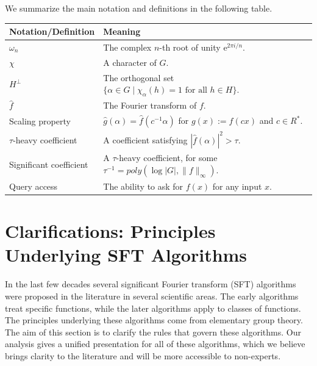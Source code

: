 \documentclass[11pt]{article}
\theoremstyle{definition}
\begin{document}
We summarize the main notation and definitions in the following table.
\begin{center}
    \begin{tabular}{ l l }
        \hline
        Notation/Definition      & Meaning                                                                                \\ \hline
        $\omega_n$               & The complex $n$-th root of unity $\mathrm{e}^{2\pi i/n}$.                              \\
        $\chi$                   & A character of $G$.                                                                    \\
        $H^\perp$                & The orthogonal set $\{\alpha \in G \mid \chi_\alpha(h) = 1 \text{ for all }h\in H\}$.  \\
        $\widehat{f}$            & The Fourier transform of $f$.                                                          \\
        Scaling property         & $\widehat{g}(\alpha) = \widehat{f}(c^{-1}\alpha)$ for $g(x) := f(cx)$ and $c \in R^*$. \\
        $\tau$-heavy coefficient & A coefficient satisfying $|\widehat{f}(\alpha)|^2>\tau$.                               \\
        Significant coefficient  & A $\tau$-heavy coefficient, for some $\tau^{-1} = poly(\log|G| , \| f \|_\infty)$.     \\
        Query access             & The ability to ask for $f(x)$ for any input $x$.                                       \\
        \hline
    \end{tabular}
\end{center}


\section{Clarifications: Principles Underlying SFT Algorithms}
\label{sec_algorithm}

In the last few decades several significant Fourier transform (SFT) algorithms were proposed in the literature in several scientific areas. The early algorithms treat specific functions, while the later algorithms apply to classes of functions. The principles underlying these algorithms come from elementary group theory. The aim of this section is to clarify the rules that govern these algorithms. Our analysis gives a unified presentation for all of these algorithms, which we believe brings clarity to the literature and will be more accessible to non-experts.
\end{document}
